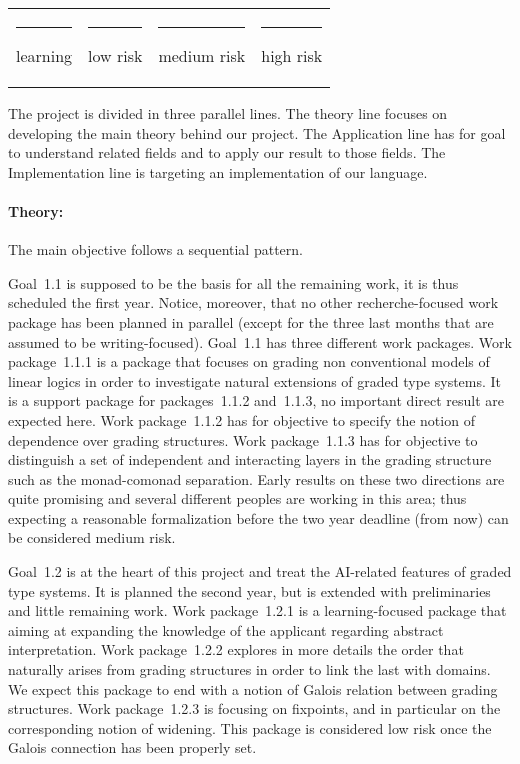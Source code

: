 \documentclass{article}[11pt]
\begin{document}
\begin{tabular}{c c c c}
{\color{cyan!20}\rule{13pt}{13pt}}  learning &
{\color{green!20}\rule{13pt}{13pt}}  low risk &
{\color{yellow!30}\rule{13pt}{13pt}}  medium risk &
{\color{red!20}\rule{13pt}{13pt}}  high risk
\end{tabular}

\medskip

The project is divided in three parallel lines. The theory line focuses on developing the main theory behind our project. The Application line has for goal to understand related fields and to apply our result to those fields. The Implementation line is targeting an implementation of our language.

\paragraph{Theory:}
The main objective follows a sequential pattern.

Goal~1.1 is supposed to be the basis for all the remaining work, it is thus scheduled the first year. Notice, moreover, that no other recherche-focused work package has been planned in parallel (except for the three last months that are assumed to be writing-focused). Goal~1.1 has three different work packages. Work package~1.1.1 is a package that focuses on grading non conventional models of linear logics in order to investigate natural extensions of graded type systems. It is a support package for packages~1.1.2 and~1.1.3, no important direct result are expected here. Work package~1.1.2 has for objective to specify the notion of dependence over grading structures. Work package~1.1.3 has for objective to distinguish a set of independent and interacting layers in the grading structure such as the monad-comonad separation. Early results on these two directions are quite promising and several different peoples are working in this area; thus expecting a reasonable formalization before the two year deadline (from now) can be considered medium risk.

Goal~1.2 is at the heart of this project and treat the AI-related features of graded type systems. It is planned the second year, but is extended with preliminaries and little remaining work. Work package~1.2.1 is a learning-focused package that aiming at expanding the knowledge of the applicant regarding abstract interpretation. Work package~1.2.2 explores in more details the order that naturally arises from grading structures in order to link the last with domains. We expect this package to end with a notion of Galois relation between grading structures. Work package~1.2.3 is focusing on fixpoints, and in particular on the corresponding notion of widening. This package is considered low risk once the Galois connection has been properly set.
\end{document}
